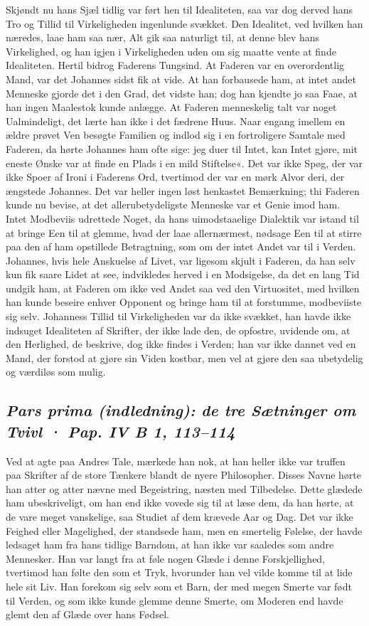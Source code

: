 \documentclass[12pt,a4paper]{article}
\newcommand{\sectionheading}[1]{\subsection*{\normalfont\itshape #1}}
\begin{document}
Skjøndt nu hans Sjæl tidlig var ført hen til Idealiteten, saa var dog derved hans Tro og Tillid til Virkeligheden ingenlunde svækket. Den Idealitet, ved hvilken han næredes, laae ham saa nær, Alt gik saa naturligt til, at denne blev hans Virkelighed, og han igjen i Virkeligheden uden om sig maatte vente at finde Idealiteten. Hertil bidrog Faderens Tungsind. At Faderen var en overordentlig Mand, var det Johannes sidst fik at vide. At han forbausede ham, at intet andet Menneske gjorde det i den Grad, det vidste han; dog han kjendte jo saa Faae, at han ingen Maalestok kunde anlægge. At Faderen menneskelig talt var noget Ualmindeligt, det lærte han ikke i det fædrene Huus. Naar engang imellem en ældre prøvet Ven besøgte Familien og indlod sig i en fortroligere Samtale med Faderen, da hørte Johannes ham ofte sige: jeg duer til Intet, kan Intet gjøre, mit eneste Ønske var at finde en Plads i en mild Stiftelse«. Det var ikke Spøg, der var ikke Spoer af Ironi i Faderens Ord, tvertimod der var en mørk Alvor deri, der ængstede Johannes. Det var heller ingen løst henkastet Bemærkning; thi Faderen kunde nu bevise, at det allerubetydeligste Menneske var et Genie imod ham. Intet Modbeviis udrettede Noget, da hans uimodstaaelige Dialektik var istand til at bringe Een til at glemme, hvad der laae allernærmest, nødsage Een til at stirre paa den af ham opstillede Betragtning, som om der intet Andet var til i Verden. Johannes, hvis hele Anskuelse af Livet, var ligesom skjult i Faderen, da han selv kun fik saare Lidet at see, indvikledes herved i en Modsigelse, da det en lang Tid undgik ham, at Faderen om ikke ved Andet saa ved den Virtuositet, med hvilken han kunde beseire enhver Opponent og bringe ham til at forstumme, modbeviiste sig selv. Johanness Tillid til Virkeligheden var da ikke svækket, han havde ikke indsuget Idealiteten af Skrifter, der ikke lade den, de opfostre, uvidende om, at den Herlighed, de beskrive, dog ikke findes i Verden; han var ikke dannet ved en Mand, der forstod at gjøre sin Viden kostbar, men vel at gjøre den saa ubetydelig og værdiløs som mulig.

\sectionheading{Pars prima (indledning): de tre Sætninger om Tvivl  ·  Pap. IV B 1, 113–114}

Ved at agte paa Andres Tale, mærkede han nok, at han heller ikke var truffen paa Skrifter af de store Tænkere blandt de nyere Philosopher. Disses Navne hørte han atter og atter nævne med Begeistring, næsten med Tilbedelse. Dette glædede ham ubeskriveligt, om han end ikke vovede sig til at læse dem, da han hørte, at de vare meget vanskelige, saa Studiet af dem krævede Aar og Dag. Det var ikke Feighed eller Magelighed, der standsede ham, men en smertelig Følelse, der havde ledsaget ham fra hans tidlige Barndom, at han ikke var saaledes som andre Mennesker. Han var langt fra at føle nogen Glæde i denne Forskjellighed, tvertimod han følte den som et Tryk, hvorunder han vel vilde komme til at lide hele sit Liv. Han forekom sig selv som et Barn, der med megen Smerte var født til Verden, og som ikke kunde glemme denne Smerte, om Moderen end havde glemt den af Glæde over hans Fødsel.
\end{document}
